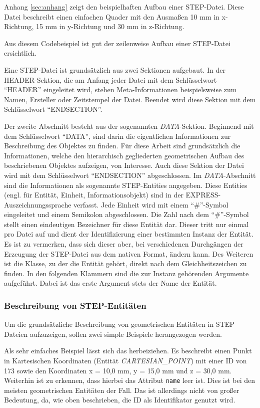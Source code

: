 Anhang \ref{sec:anhang} zeigt den beispielhaften Aufbau einer STEP-Datei. Diese Datei beschreibt einen einfachen Quader mit den Ausmaßen 10 mm in x-Richtung, 15 mm in y-Richtung und 30 mm in z-Richtung. 

Aus diesem Codebeispiel ist gut der zeilenweise Aufbau einer STEP-Datei ersichtlich. 

Eine STEP-Datei ist grundsätzlich aus zwei Sektionen aufgebaut. 
In der HEADER-Sektion, die am Anfang jeder Datei mit dem Schlüsselwort "`HEADER"' eingeleitet wird, stehen Meta-Informationen beispielsweise zum Namen, Ersteller oder Zeitstempel der Datei. Beendet wird diese Sektion mit dem Schlüsselwort "`ENDSECTION"'.

Der zweite Abschnitt besteht aus der sogenannten \textit{DATA}-Sektion. Beginnend mit dem Schlüsselwort "`DATA"', sind darin die eigentlichen Informationen zur Beschreibung des Objektes zu finden. Für diese Arbeit sind grundsätzlich die Informationen, welche den hierarchisch gegliederten geometrischen Aufbau des beschriebenen Objektes aufzeigen, von Interesse. Auch diese Sektion der Datei wird mit dem Schlüsselwort "`ENDSECTION"' abgeschlossen. Im \textit{DATA}-Abschnitt sind die Informationen als sogenannte STEP-Entities angegeben. Diese Entities (engl. für Entität, Einheit, Informationsobjekt) sind in der EXPRESS-Auszeichnungssprache verfasst. Jede Einheit wird mit einem "`\#"'-Symbol eingeleitet und einem Semikolon abgeschlossen. Die Zahl nach dem "`\#"'-Symbol stellt einen eindeutigen Bezeichner für diese Entität dar. Dieser tritt nur einmal pro Datei auf und dient der Identifizierung einer bestimmten Instanz der Entität. Es ist zu vermerken, dass sich dieser aber, bei verschiedenen Durchgängen der Erzeugung der STEP-Datei aus dem nativen Format, ändern kann.
Des Weiteren ist die Klasse, zu der die Entität gehört, direkt nach dem Gleichheitszeichen zu finden. In den folgenden Klammern sind die zur Instanz gehörenden Argumente aufgeführt. Dabei ist das erste Argument stets der Name der Entität. 

\subsubsection{Beschreibung von STEP-Entitäten}

Um die grundsätzliche Beschreibung von geometrischen Entitäten in STEP Dateien aufzuzeigen, sollen zwei simple Beispiele herangezogen werden.

Als sehr einfaches Beispiel lässt sich das  herbeiziehen. Es beschreibt einen Punkt in Kartesischen Koordinaten (Entität \textit{CARTESIAN\_POINT}) mit einer ID von 173 sowie den Koordinaten x = 10,0 mm, y = 15,0 mm und z = 30,0 mm. Weiterhin ist zu erkennen, dass hierbei das Attribut \verb|name| leer ist. Dies ist bei den meisten geometrischen Entitäten der Fall. Das ist allerdings nicht von großer Bedeutung, da, wie oben beschrieben, die ID als Identifikator genutzt wird.    

